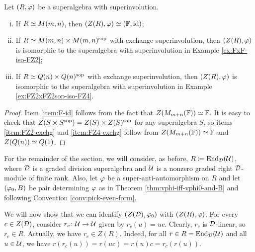
\begin{prop}
    Let $(R, \varphi)$ be a superalgebra with superinvolution.
    \begin{enumerate}[(i)]
        \item If $R\simeq M(m,n)$, then $(Z(R), \varphi) \simeq (\mathbb{F}, \operatorname{id})$;\label{item:F-id}
        \item If $R\simeq M(m,n)\times M(m,n)^{\mathrm{sop}}$ with exchange superinvolution, then $(Z(R), \varphi)$ is isomorphic to the superalgebra with superinvolution in Example \ref{ex:FxF-iso-FZ2};\label{item:FZ2-exchg}
        \item If $R\simeq Q(n)\times Q(n)^{\mathrm{sop}}$ with exchange superinvolution, then $(Z(R), \varphi)$ is isomorphic to the superalgebra with superinvolution in Example \ref{ex:FZ2xFZ2sop-iso-FZ4}.\label{item:FZ4-exchg}
    \end{enumerate}
\end{prop}

\begin{proof}
    Item \eqref{item:F-id} follows from the fact that $Z(M_{m+n}(\mathbb{F})) \simeq \mathbb{F}$. 
    It is easy to check that $Z(S\times S^{\mathrm{sop}}) = Z(S) \times Z(S)^{\mathrm{sop}}$ for any superalgebra $S$, so items \eqref{item:FZ2-exchg} and \eqref{item:FZ4-exchg} follow from $Z(M_{m+n}(\mathbb{F})) \simeq \mathbb{F}$ and $Z(Q(n)) \simeq Q(1)$.
\end{proof}

For the remainder of the section, we will consider, as before, $R \coloneqq \operatorname{End}_{\mathcal{D}}(\mathcal U)$, where $\mathcal{D}$ is a graded division superalgebra and $\mathcal U$ is a nonzero graded right $\mathcal{D}$-module of finite rank. 
Also, let $\varphi$ be a super-anti-automorphism on $R$ and let $(\varphi_0, B)$ be pair determining $\varphi$ as in Theorem \ref{thm:vphi-iff-vphi0-and-B} and following Convention \ref{conv:pick-even-form}.

We will now show that we can identify $(Z(\mathcal{D}), \varphi_0)$ with $(Z(R), \varphi)$. 
For every $c\in Z(\mathcal{D})$, consider $r_c\colon \mathcal U \to \mathcal U$ given by $r_c(u) = uc$. 
Clearly, $r_c$ is $\mathcal{D}$-linear, so $r_c \in R$. 
Actually, we have $r_c\in Z(R)$. 
Indeed, for all $r\in R = \operatorname{End}_{\mathcal{D}}(\mathcal U)$ and all $u\in \mathcal U$, we have $r (r_c(u)) = r(uc) = r(u) c = r_c(r(u))$.

